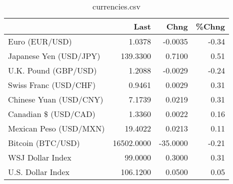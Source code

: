 \documentclass{article}%
\begin{document}
%


\begin{table}[htbp]%
\caption{currencies.csv}%
\centering%
\begin{adjustbox}{width=1\textwidth}%
\begin{tabular}{lrrr}
\toprule
                       &       Last &     Chng &  \%Chng \\
\midrule
        Euro (EUR/USD) &     1.0378 &  -0.0035 &  -0.34 \\
Japanese Yen (USD/JPY) &   139.3300 &   0.7100 &   0.51 \\
  U.K. Pound (GBP/USD) &     1.2088 &  -0.0029 &  -0.24 \\
 Swiss Franc (USD/CHF) &     0.9461 &   0.0029 &   0.31 \\
Chinese Yuan (USD/CNY) &     7.1739 &   0.0219 &   0.31 \\
  Canadian \$ (USD/CAD) &     1.3360 &   0.0022 &   0.16 \\
Mexican Peso (USD/MXN) &    19.4022 &   0.0213 &   0.11 \\
     Bitcoin (BTC/USD) & 16502.0000 & -35.0000 &  -0.21 \\
      WSJ Dollar Index &    99.0000 &   0.3000 &   0.31 \\
     U.S. Dollar Index &   106.1200 &   0.0500 &   0.05 \\
\bottomrule
\end{tabular}
%
\end{adjustbox}%
\end{table}

%
\end{document}

